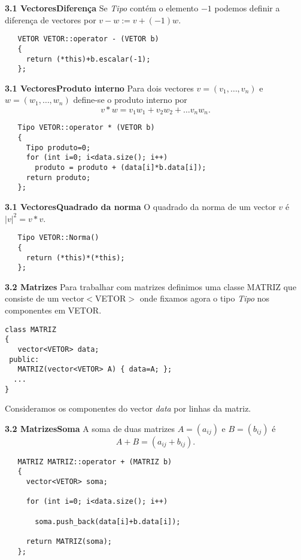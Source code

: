 \documentclass{beamer}
\begin{document}
\begin{frame}[fragile]{\bf 3.1 Vectores}{\bf Diferença}
Se {\it Tipo} contém o elemento $-1$ podemos definir a diferença de vectores por $v-w := v + (-1)w$.

\lstset{language=C++}
\begin{lstlisting}
   VETOR VETOR::operator - (VETOR b)
   {
     return (*this)+b.escalar(-1);
   };
\end{lstlisting}
\end{frame}

\begin{frame}[fragile]{\bf 3.1 Vectores}{\bf Produto interno}
Para dois vectores $v=(v_1,\ldots, v_n)$ e $w=(w_1,\ldots, w_n)$ define-se o produto interno por
$$ v * w = v_1w_1 + v_2w_2 + \ldots v_nw_n.$$
\lstset{language=C++}
\begin{lstlisting}
   Tipo VETOR::operator * (VETOR b)
   {
     Tipo produto=0;              
     for (int i=0; i<data.size(); i++)
       produto = produto + (data[i]*b.data[i]);
     return produto;
   };
\end{lstlisting}
\end{frame}


\begin{frame}[fragile]{\bf 3.1 Vectores}{\bf Quadrado da norma}
O quadrado da norma de um vector $v$ é $|v|^2 = v*v$. 
\lstset{language=C++}
\begin{lstlisting}
   Tipo VETOR::Norma()
   {
     return (*this)*(*this);
   };
\end{lstlisting}
\end{frame}


 
\begin{frame}[fragile]{\bf 3.2 Matrizes}
Para trabalhar com matrizes definimos uma classe MATRIZ que consiste de um vector$<$VETOR$>$ onde fixamos agora o tipo {\it Tipo } nos componentes em VETOR.

\lstset{language=C++}
\begin{lstlisting}
class MATRIZ
{
   vector<VETOR> data;
 public:
   MATRIZ(vector<VETOR> A) { data=A; };    
  ...
}
\end{lstlisting}
Consideramos os componentes do vector {\it data} por linhas da matriz.
\end{frame}


\begin{frame}[fragile]{\bf 3.2 Matrizes}{\bf Soma}
A soma de duas matrizes $A=(a_{ij})$ e $B=(b_{ij})$ é 
$$ A + B = ( a_{ij}+b_{ij} ).$$
\lstset{language=C++}
\begin{lstlisting}
   MATRIZ MATRIZ::operator + (MATRIZ b)
   {
     vector<VETOR> soma;                 

     for (int i=0; i<data.size(); i++) 
      
       soma.push_back(data[i]+b.data[i]);
     
     return MATRIZ(soma);
   };
\end{lstlisting}
\end{frame}
\end{document}
